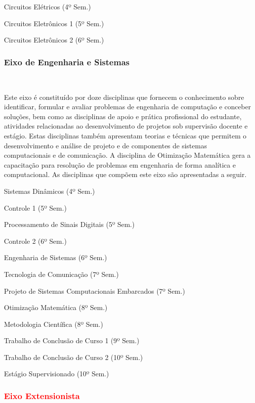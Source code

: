 \begin{compenum}
    \item Circuitos Elétricos (4º Sem.)
    \item Circuitos Eletrônicos 1 (5º Sem.)
    \item Circuitos Eletrônicos 2 (6º Sem.)
\end{compenum}

\subsubsection{Eixo de Engenharia e Sistemas}~\label{sec:E7}

Este eixo é constituído por doze disciplinas que fornecem o conhecimento sobre identificar, formular e avaliar problemas de engenharia de computação e conceber soluções, bem como as disciplinas de apoio e prática profissional do estudante, atividades relacionadas ao desenvolvimento de projetos sob supervisão docente e estágio. Estas disciplinas também apresentam teorias e técnicas que permitem o desenvolvimento e análise de projeto e de componentes de sistemas computacionais e de comunicação. A disciplina de Otimização Matemática gera a capacitação para resolução de problemas em engenharia de forma analítica e computacional. As disciplinas que compõem este eixo são apresentadas a seguir.

\begin{compenum}
    \item Sistemas Dinâmicos (4º Sem.)
    \item Controle 1 (5º Sem.)
    \item Processamento de Sinais Digitais (5º Sem.)
    \item Controle 2 (6º Sem.)
    \item Engenharia de Sistemas (6º Sem.)
    \item Tecnologia de Comunicação (7º Sem.)
    \item Projeto de Sistemas Computacionais Embarcados (7º Sem.)
    \item Otimização Matemática (8º Sem.)
    \item Metodologia Científica (8º Sem.)
    \item Trabalho de Conclusão de Curso 1 (9º Sem.)
    \item Trabalho de Conclusão de Curso 2 (10º Sem.)
    \item Estágio Supervisionado (10º Sem.)
\end{compenum}

\textcolor{red}{\subsubsection{Eixo Extensionista }~\label{sec:E9}}

